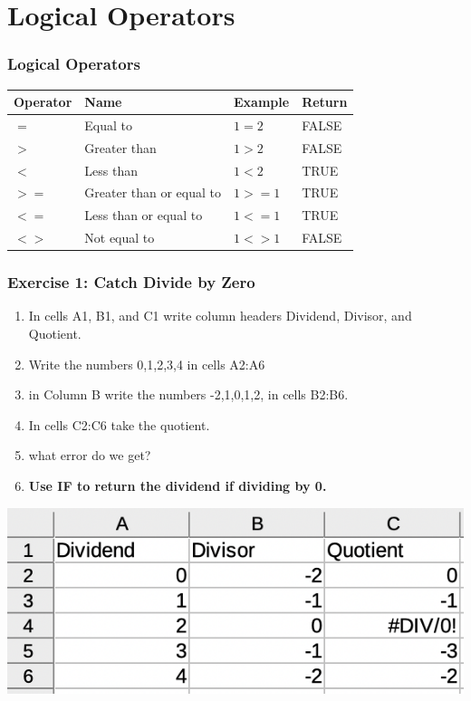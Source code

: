 \documentclass[12pt]{beamer}
\begin{document}
\section{Logical Operators}
	\begin{frame}
		\frametitle{Logical Operators}
			\begin{center}
				\begin{tabular}{llll}
					Operator & Name & Example & Return\\
					\hline
					$=$ & Equal to & $1=2$ & FALSE \\
					$>$ & Greater than & $1>2$ & FALSE \\
					$<$ & Less than & $1<2$ & TRUE \\
					$>=$ & Greater than or equal to & $1>=1$ & TRUE\\
					$<=$ & Less than or equal to &  $1<= 1$ & TRUE \\
					$<>$ & Not equal to & $1<>1$ & FALSE
				\end{tabular}
			\end{center}
	\end{frame}
	\begin{frame}
		\frametitle{Exercise 1: Catch Divide by Zero}
		\begin{enumerate}
			\item In cells A1, B1, and C1 write column headers Dividend, Divisor, and Quotient. 
			\item Write the numbers 0,1,2,3,4 in cells A2:A6
			\item in Column B write the numbers -2,1,0,1,2, in cells 
			B2:B6. 
			\item In cells C2:C6 take the quotient. 
			\item what error do we get?
			\item \textbf{Use IF to return the dividend if dividing by 0.} 
		\end{enumerate}
		\begin{center}
		\includegraphics[width= 0.6 \textwidth]{Exercise1Setup.png}
	\end{center}
	\end{frame}
\end{document}
